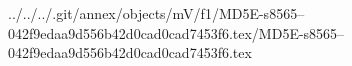 ../../../.git/annex/objects/mV/f1/MD5E-s8565--042f9edaa9d556b42d0cad0cad7453f6.tex/MD5E-s8565--042f9edaa9d556b42d0cad0cad7453f6.tex